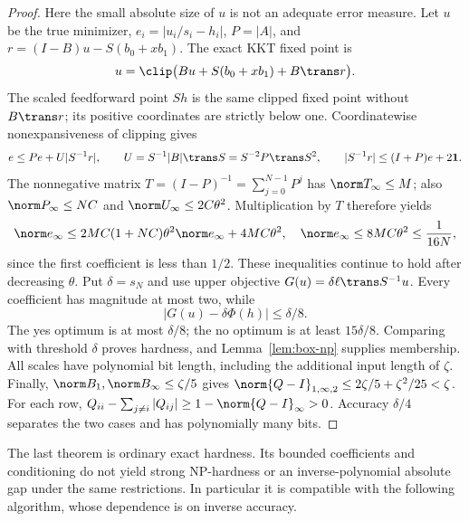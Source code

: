 \begin{proof}
Here the small absolute size of \(u\) is not an adequate error measure.
Let \(u\) be the true minimizer, \(e_i=|u_i/s_i-h_i|\),
\(P=|A|\), and \(r=(I-B)u-S(b_0+xb_1)\). The exact KKT fixed point is
\[
 u=\clip\bigl(Bu+S(b_0+xb_1)+B\trans r\bigr).
\]
The scaled feedforward point \(Sh\) is the same clipped fixed point without
\(B\trans r\); its positive coordinates are strictly below one.
Coordinatewise nonexpansiveness of clipping gives
\[
 e\le Pe+U|S^{-1}r|,\qquad
 U=S^{-1}|B|\trans S=S^{-2}P\trans S^2,
 \qquad |S^{-1}r|\le(I+P)e+2\mathbf1.
\]
The nonnegative matrix \(T=(I-P)^{-1}=\sum_{j=0}^{N-1}P^j\) has
\(\norm T_\infty\le M\); also \(\norm P_\infty\le NC\) and
\(\norm U_\infty\le2C\theta^2\). Multiplication by \(T\) therefore yields
\[
 \norm e_\infty\le 2MC(1+NC)\theta^2\norm e_\infty+4MC\theta^2,
 \quad
 \norm e_\infty\le8MC\theta^2\le\frac1{16N},
\]
since the first coefficient is less than \(1/2\). These inequalities continue
to hold after decreasing \(\theta\).
Put \(\delta=s_N\) and use upper objective \(G(u)=\delta\ell\trans S^{-1}u\).
Every coefficient has magnitude at most two, while
\[
 |G(u)-\delta\Phi(h)|\le\delta/8.
\]
The yes optimum is at most \(\delta/8\); the no optimum is at least
\(15\delta/8\). Comparing with threshold \(\delta\) proves hardness, and
Lemma~\ref{lem:box-np} supplies membership. All scales have polynomial bit
length, including the additional input length of \(\zeta\).
Finally, \(\norm B_1,\norm B_\infty\le\zeta/5\) gives
\(\norm{Q-I}_{1,\infty,2}\le2\zeta/5+\zeta^2/25<\zeta\).
For each row, \(Q_{ii}-\sum_{j\ne i}|Q_{ij}|\ge1-\norm{Q-I}_\infty>0\).
Accuracy \(\delta/4\) separates the two cases and has polynomially many bits.
\end{proof}
The last theorem is ordinary exact hardness. Its bounded coefficients and
conditioning do not yield strong NP-hardness or an inverse-polynomial
absolute gap under the same restrictions. In particular it is compatible with
the following algorithm, whose dependence is on inverse accuracy.

